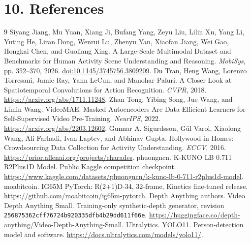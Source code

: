 \documentclass[12pt,a4paper]{article}
\newcommand{\pageheading}[1]{\vspace*{-5pt}\section*{#1}}
\begin{document}
\newpage
\pageheading{10. References}
\begingroup
\renewcommand{\section}[2]{}
\begin{thebibliography}{9}
\setlength{\itemsep}{5pt}
 Siyang Jiang, Mu Yuan, Xiang Ji, Bufang Yang, Zeyu Liu, Lilin Xu, Yang Li, Yuting He, Liran Dong, Wenrui Lu, Zhenyu Yan, Xiaofan Jiang, Wei Gao, Hongkai Chen, and Guoliang Xing. A Large-Scale Multimodal Dataset and Benchmarks for Human Activity Scene Understanding and Reasoning. \emph{MobiSys}, pp. 352--370, 2026. \href{https://doi.org/10.1145/3745756.3809209}{doi:10.1145/3745756.3809209}.
 Du Tran, Heng Wang, Lorenzo Torresani, Jamie Ray, Yann LeCun, and Manohar Paluri. A Closer Look at Spatiotemporal Convolutions for Action Recognition. \emph{CVPR}, 2018. \url{https://arxiv.org/abs/1711.11248}.
 Zhan Tong, Yibing Song, Jue Wang, and Limin Wang. VideoMAE: Masked Autoencoders Are Data-Efficient Learners for Self-Supervised Video Pre-Training. \emph{NeurIPS}, 2022. \url{https://arxiv.org/abs/2203.12602}.
 Gunnar A. Sigurdsson, G\"ul Varol, Xiaolong Wang, Ali Farhadi, Ivan Laptev, and Abhinav Gupta. Hollywood in Homes: Crowdsourcing Data Collection for Activity Understanding. \emph{ECCV}, 2016. \url{https://prior.allenai.org/projects/charades}.
 phuongncn. K-KUNO LB 0.711 R2Plus1D Model. Public Kaggle competition checkpoint. \url{https://www.kaggle.com/datasets/phuongncn/k-kuno-lb-0-711-r2plus1d-model}.
 moabitcoin. IG65M PyTorch: R(2+1)D-34, 32-frame, Kinetics fine-tuned release. \url{https://github.com/moabitcoin/ig65m-pytorch}.
 Depth Anything authors. Video Depth Anything Small. Training-only synthetic-depth generator, revision \texttt{256875362cff76724b920335dfb4b29dd611f66e}. \url{https://huggingface.co/depth-anything/Video-Depth-Anything-Small}.
 Ultralytics. YOLO11. Person-detection model and software. \url{https://docs.ultralytics.com/models/yolo11/}.
\end{thebibliography}
\endgroup
\end{document}
